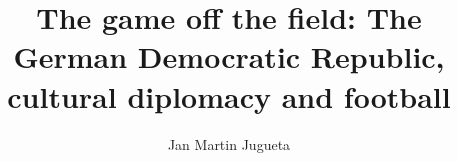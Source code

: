 \documentclass[logo]{style/usydthesis}
\begin{document}
\renewcommand{\thepage}{\roman{page}}	
\title{{\bf\Huge The game off the field: The German Democratic Republic, cultural diplomacy and football}}
\author{Jan Martin Jugueta}

\maketitle
{}

%
%
%
\def\table{\def\figurename{Table}\figure}
\let\endtable\endfigure 

\setcounter{tocdepth}{2}
\newpage
{}
\tableofcontents



\renewcommand\listfigurename{List of figures and tables}

\listoffigures
\cleardoublepage





\renewcommand{\thepage}{\arabic{page}}	
\setupParagraphs
\setcounter{chapter}{0}
\setcounter{page}{1}








%
%
\printbibliography

\appendix

\end{document}
